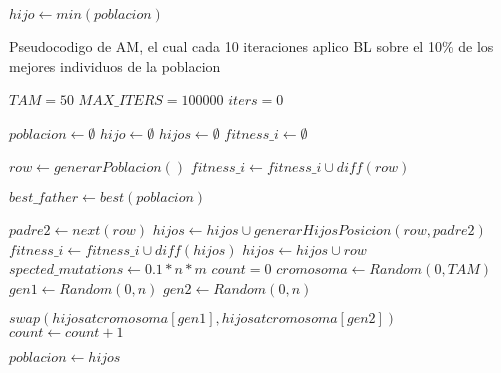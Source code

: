 \begin{algorithm}[H]
\begin{algorithmic}[1]
      \EndWhile

      \State $hijo \gets min(poblacion)$
      
      \State {}
    \EndFunction
  \end{algorithmic}
\end{algorithm}


Pseudocodigo de AM, el cual cada 10 iteraciones aplico BL sobre el 10\% de los mejores individuos de la poblacion
\begin{algorithm}[H]
  \begin{algorithmic}[1]
      \State $TAM = 50$
      \State $MAX\_ITERS = 100000$
      \State $iters = 0$

      \State $poblacion \gets \emptyset$ 
      \State $hijo \gets \emptyset$ 
      \State $hijos \gets \emptyset$
      \State $fitness\_i \gets \emptyset$
      
        \State $row \gets generarPoblacion()$
        \State $fitness\_i \gets fitness\_i \cup diff(row)$
      \EndFor

        \State $best\_father \gets  best(poblacion)$ 

          \State $padre2 \gets next(row)$ 
            \State $hijos \gets hijos \cup generarHijosPosicion(row,padre2)$
            \State $fitness\_i \gets fitness\_i \cup diff(hijos)$  
          \Else
            \State $hijos \gets hijos \cup row$
          \EndIf
        \EndFor
        \State $spected\_mutations \gets 0.1*n*m$
        \State $count = 0$
          \State $cromosoma \gets Random(0,TAM)$ 
          \State $gen1 \gets Random(0,n)$
          \State $gen2 \gets Random(0,n)$ 

           
            \State $swap(hijos at cromosoma[gen1], hijos at cromosoma[gen2])$
          \EndIf
          \State $count \gets count +1 $
        \EndWhile

        \State $poblacion \gets hijos$ 


\end{algorithmic}
\end{algorithm}
